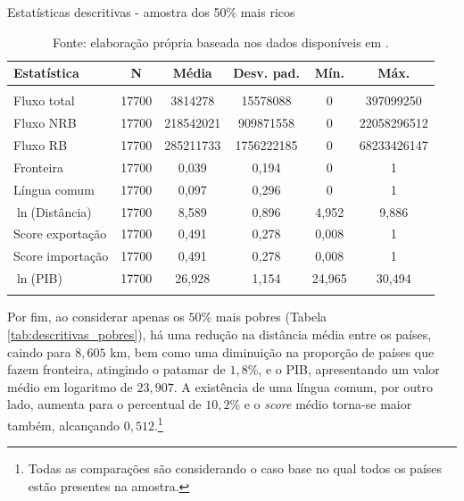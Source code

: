 \documentclass[12pt,
               openright,
               oneside,
               a4paper,
							 section=TITLE,     %
               subsection=Title,  %
               english,brazil]{article}
\begin{document}
\begin{table}[H] \centering 
	\caption{Estatísticas descritivas - amostra dos 50\% mais ricos} 
	\label{tab:descritivas_ricos} 
	\begin{tabular}{@{\extracolsep{5pt}}lccccc} 
		\\[-1.8ex]\toprule 
		Estatística & \multicolumn{1}{c}{N} & \multicolumn{1}{c}{Média} & \multicolumn{1}{c}{Desv. pad.} & \multicolumn{1}{c}{Mín.} &  \multicolumn{1}{c}{Máx.} \\ 
		\midrule \\[-1.8ex] 
		Fluxo total & 17700 & 3814278 & 15578088 & 0 &  397099250 \\ 
		Fluxo NRB & 17700 & 218542021 & 909871558 & 0 & 22058296512 \\ 
		Fluxo RB & 17700 & 285211733 & 1756222185 & 0 &  68233426147 \\ 
		Fronteira & 17700 & 0,039 & 0,194 & 0 & 1 \\ 
		Língua comum & 17700 & 0,097 & 0,296 & 0 & 1 \\ 
		$\ln$(Distância) & 17700 & 8,589 & 0,896 & 4,952 & 9,886 \\ 
		Score exportação & 17700 & 0,491 & 0,278 & 0,008 &  1 \\ 
		Score importação & 17700 & 0,491 & 0,278 & 0,008 &  1 \\ $\ln$(PIB) & 17700 & 26,928 & 1,154 & 24,965 & 30,494\\
		\bottomrule \\[-1.8ex] 
	\end{tabular} 
\caption*{\RaggedRight  Fonte: elaboração própria baseada nos dados disponíveis em \cite{Cepii2019, Comtrade2019, WorldBank2019}.}
\end{table} 
Por fim, ao considerar apenas os $50\%$ mais pobres (Tabela \ref{tab:descritivas_pobres}), há uma redução na distância média entre os países, caindo para $8,605$ km, bem como uma diminuição na proporção de países que fazem fronteira, atingindo o patamar de $1,8\%$, e o PIB, apresentando um valor médio em logaritmo de $23,907$. A existência de uma língua comum, por outro lado, aumenta para o percentual de $10,2\%$ e o \textit{score} médio torna-se maior também, alcançando $0,512$.\footnote{Todas as comparações são considerando o caso base no qual todos os países estão presentes na amostra.}
\end{document}
